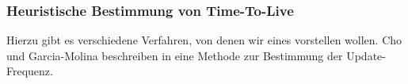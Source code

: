 \subsubsection{Heuristische Bestimmung von Time-To-Live}
Hierzu gibt es verschiedene Verfahren, von denen wir eines vorstellen wollen.
Cho und Garcia-Molina beschreiben in \cite{ChGM:2003:ChangeFrequency} eine Methode zur Bestimmung der Update-Frequenz.
